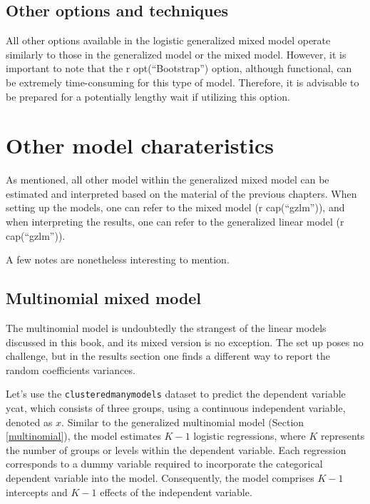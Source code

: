 \documentclass[
]{book}
\begin{document}
\hypertarget{other-options-and-techniques}{%
\subsection{Other options and techniques}\label{other-options-and-techniques}}

All other options available in the logistic generalized mixed model operate similarly to those in the generalized model or the mixed model. However, it is important to note that the r opt(``Bootstrap'') option, although functional, can be extremely time-consuming for this type of model. Therefore, it is advisable to be prepared for a potentially lengthy wait if utilizing this option.

\hypertarget{other-model-charateristics}{%
\section{Other model charateristics}\label{other-model-charateristics}}

As mentioned, all other model within the generalized mixed model can be estimated and interpreted based on the material of the previous chapters. When setting up the models, one can refer to the mixed model (r cap(``gzlm'')), and when interpreting the results, one can refer to the generalized linear model (r cap(``gzlm'')).

A few notes are nonetheless interesting to mention.

\hypertarget{multinomial-mixed-model}{%
\subsection{Multinomial mixed model}\label{multinomial-mixed-model}}

The multinomial model is undoubtedly the strangest of the linear models discussed in this book, and its mixed version is no exception. The set up poses no challenge, but in the results section one finds a different way to report the random coefficients variances.

Let's use the \texttt{clusteredmanymodels} dataset to predict the dependent variable ycat, which consists of three groups, using a continuous independent variable, denoted as \(x\). Similar to the generalized multinomial model (Section \ref{multinomial}), the model estimates \(K-1\) logistic regressions, where \(K\) represents the number of groups or levels within the dependent variable. Each regression corresponds to a dummy variable required to incorporate the categorical dependent variable into the model. Consequently, the model comprises \(K-1\) intercepts and \(K-1\) effects of the independent variable.
\end{document}
